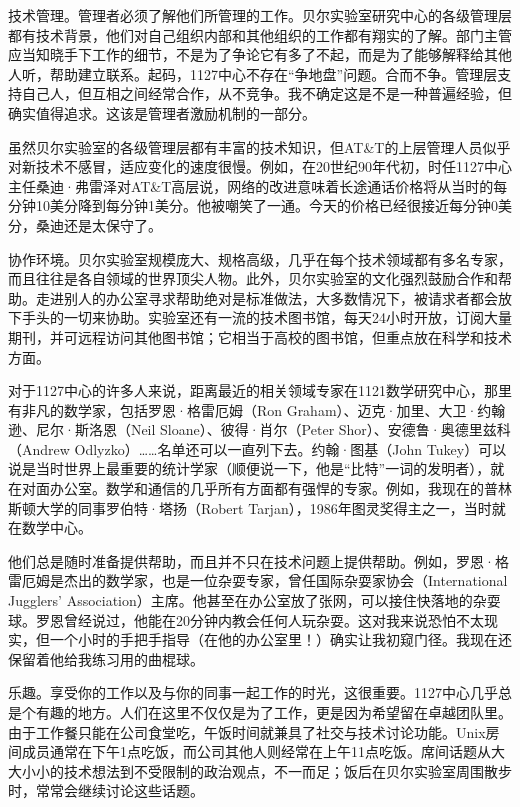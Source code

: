 \documentclass[a4paper,12pt,UTF8,twoside]{ctexbook}
\begin{document}
技术管理。管理者必须了解他们所管理的工作。贝尔实验室研究中心的各级管理层都有技术背景，他们对自己组织内部和其他组织的工作都有翔实的了解。部门主管应当知晓手下工作的细节，不是为了争论它有多了不起，而是为了能够解释给其他人听，帮助建立联系。起码，1127中心不存在“争地盘”问题。合而不争。管理层支持自己人，但互相之间经常合作，从不竞争。我不确定这是不是一种普遍经验，但确实值得追求。这该是管理者激励机制的一部分。

虽然贝尔实验室的各级管理层都有丰富的技术知识，但AT\&T的上层管理人员似乎对新技术不感冒，适应变化的速度很慢。例如，在20世纪90年代初，时任1127中心主任桑迪·弗雷泽对AT\&T高层说，网络的改进意味着长途通话价格将从当时的每分钟10美分降到每分钟1美分。他被嘲笑了一通。今天的价格已经很接近每分钟0美分，桑迪还是太保守了。

协作环境。贝尔实验室规模庞大、规格高级，几乎在每个技术领域都有多名专家，而且往往是各自领域的世界顶尖人物。此外，贝尔实验室的文化强烈鼓励合作和帮助。走进别人的办公室寻求帮助绝对是标准做法，大多数情况下，被请求者都会放下手头的一切来协助。实验室还有一流的技术图书馆，每天24小时开放，订阅大量期刊，并可远程访问其他图书馆；它相当于高校的图书馆，但重点放在科学和技术方面。

对于1127中心的许多人来说，距离最近的相关领域专家在1121数学研究中心，那里有非凡的数学家，包括罗恩·格雷厄姆（Ron Graham）、迈克·加里、大卫·约翰逊、尼尔·斯洛恩（Neil Sloane）、彼得·肖尔（Peter Shor）、安德鲁·奥德里兹科（Andrew Odlyzko）……名单还可以一直列下去。约翰·图基（John Tukey）可以说是当时世界上最重要的统计学家（顺便说一下，他是“比特”一词的发明者），就在对面办公室。数学和通信的几乎所有方面都有强悍的专家。例如，我现在的普林斯顿大学的同事罗伯特·塔扬（Robert Tarjan），1986年图灵奖得主之一，当时就在数学中心。

他们总是随时准备提供帮助，而且并不只在技术问题上提供帮助。例如，罗恩·格雷厄姆是杰出的数学家，也是一位杂耍专家，曾任国际杂耍家协会（International Jugglers’ Association）主席。他甚至在办公室放了张网，可以接住快落地的杂耍球。罗恩曾经说过，他能在20分钟内教会任何人玩杂耍。这对我来说恐怕不太现实，但一个小时的手把手指导（在他的办公室里！）确实让我初窥门径。我现在还保留着他给我练习用的曲棍球。

乐趣。享受你的工作以及与你的同事一起工作的时光，这很重要。1127中心几乎总是个有趣的地方。人们在这里不仅仅是为了工作，更是因为希望留在卓越团队里。由于工作餐只能在公司食堂吃，午饭时间就兼具了社交与技术讨论功能。Unix房间成员通常在下午1点吃饭，而公司其他人则经常在上午11点吃饭。席间话题从大大小小的技术想法到不受限制的政治观点，不一而足；饭后在贝尔实验室周围散步时，常常会继续讨论这些话题。
\end{document}
